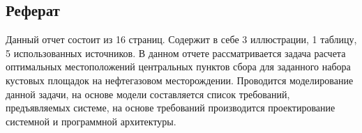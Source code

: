 \subsection*{\Large{Реферат}}
Данный отчет состоит из 16 страниц.
Содержит в себе 3 иллюстрации, 1 таблицу, 5 использованных источников.
В данном отчете рассматривается задача расчета
оптимальных местоположений центральных пунктов
сбора для заданного набора кустовых площадок
на нефтегазовом месторождении.
Проводится моделирование данной задачи,
на основе модели составляется список требований,
предъявляемых системе, на основе требований производится проектирование системной и программной архитектуры.
\newpage
%
%
%
%
%
%
%
%
%
%
%
%
%
%
%
%
%
%
%
%
%
